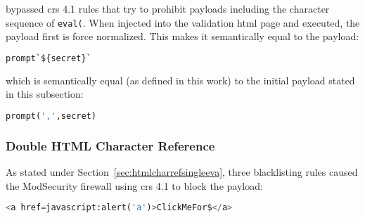 bypassed \acrshort{crs} 4.1 rules that try to prohibit payloads including the character sequence of \verb|eval(|. When injected into the validation \acrshort{html} page and executed, the payload first is force normalized. This makes it semantically equal to the payload:

\begin{lstlisting}[style=basicStyle, language=Python]
prompt`${secret}`
\end{lstlisting}

which is semantically equal (as defined in this work) to the initial payload stated in this subsection:

\begin{lstlisting}[style=basicStyle, language=Python]
prompt(',',secret)
\end{lstlisting}


%
%
%


\subsubsection{Double HTML Character Reference}
\label{sec:doublehtmlcharref}
As stated under Section~\ref{sec:htmlcharrefsingleeva}, three blacklisting rules caused the ModSecurity firewall using \acrshort{crs} 4.1 to block the payload:

\begin{lstlisting}[style=basicStyle, language=Python]
<a href=javascript:alert('a')>ClickMeFor$</a>
\end{lstlisting}

